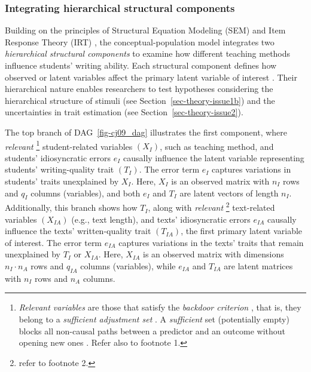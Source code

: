 \documentclass[
  authoryear,
  review,
  1p]{elsarticle}
\begin{document}
\subsubsection{Integrating hierarchical structural
components}\label{sec-theory-theoretical_P3}

Building on the principles of Structural Equation Modeling (SEM)
\citep{Hoyle_et_al_2023} and Item Response Theory (IRT)
\citep{Fox_2010, vanderLinden_et_al_2017_I}, the conceptual-population
model integrates two \emph{hierarchical structural components} to
examine how different teaching methods influence students' writing
ability. Each structural component defines how observed or latent
variables affect the primary latent variable of interest
\citep{Everitt_et_al_2010}. Their hierarchical nature enables
researchers to test hypotheses considering the hierarchical structure of
stimuli (see Section~\ref{sec-theory-issue1b}) and the uncertainties in
trait estimation (see Section~\ref{sec-theory-issue2}).

The top branch of DAG~\ref{fig-cj09_dag} illustrates the first
component, where \emph{relevant} \footnote{\emph{Relevant variables} are
  those that satisfy the \emph{backdoor criterion} \citep[pp
  37]{Neal_2020}, that is, they belong to a \emph{sufficient adjustment
  set} \citep{Pearl_2009, Pearl_et_al_2016, Morgan_et_al_2014}. A
  \emph{sufficient} set (potentially empty) blocks all non-causal paths
  between a predictor and an outcome without opening new ones
  \citep{Pearl_2009}. Refer also to footnote 1.} student-related
variables \((X_{I})\), such as teaching method, and students'
idiosyncratic errors \(e_{I}\) causally influence the latent variable
representing students' writing-quality trait \((T_{I})\). The error term
\(e_{I}\) captures variations in students' traits unexplained by
\(X_{I}\). Here, \(X_{I}\) is an observed matrix with \(n_{I}\) rows and
\(q_{I}\) columns (variables), and both \(e_{I}\) and \(T_{I}\) are
latent vectors of length \(n_{I}\). Additionally, this branch shows how
\(T_{I}\), along with \emph{relevant} \footnote{refer to footnote 2.}
text-related variables \((X_{IA})\) (e.g., text length), and texts'
idiosyncratic errors \(e_{IA}\) causally influence the texts'
written-quality trait \((T_{IA})\), the first primary latent variable of
interest. The error term \(e_{IA}\) captures variations in the texts'
traits that remain unexplained by \(T_{I}\) or \(X_{IA}\). Here,
\(X_{IA}\) is an observed matrix with dimensions \(n_{I} \cdot n_{A}\)
rows and \(q_{IA}\) columns (variables), while \(e_{IA}\) and \(T_{IA}\)
are latent matrices with \(n_{I}\) rows and \(n_{A}\) columns.
\end{document}
